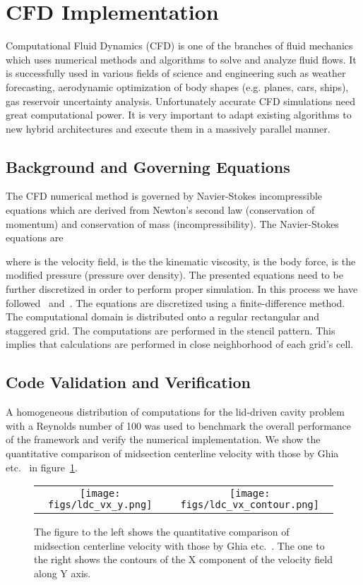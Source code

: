 \documentclass{IOS-Book-Article}
\begin{document}
\section{CFD Implementation}
\label{CFD}
Computational Fluid Dynamics (CFD) is one of the branches of fluid mechanics which 
uses numerical methods and algorithms to solve and analyze fluid flows. It is successfully 
used in various fields of science and engineering such as weather forecasting, 
aerodynamic optimization of body shapes (e.g. planes, cars, ships), gas reservoir uncertainty analysis. 
Unfortunately accurate CFD simulations need great computational power.
It is very important to adapt existing algorithms to new hybrid architectures and execute them
in a massively parallel manner. 

\subsection{Background and Governing Equations}
The CFD numerical method is governed by Navier-Stokes incompressible equations which are 
derived from Newton's second law (conservation of momentum) and conservation of mass 
(incompressibility). The Navier-Stokes equations are


where  is the velocity field,  is the the kinematic viscosity,  is the body force,
 is the modified pressure (pressure over density). 
The presented equations need to be further discretized in order to perform proper simulation.
In this process we have followed~\cite{VOF_Hirt79} and~\cite{NASA_VOF2D_Torrey}.
The equations are discretized using a finite-difference method. The computational 
domain is distributed onto a regular rectangular and staggered grid. 
The computations are performed in the stencil pattern. This implies that calculations 
are performed in close neighborhood of each grid's cell. 




\subsection{Code Validation and Verification}
A homogeneous distribution of computations for the lid-driven cavity problem with a Reynolds 
number of 100 was used to benchmark the 
overall performance of the framework and verify the numerical implementation. We show 
the quantitative comparison of midsection centerline velocity with those by Ghia etc.~\cite{GhiaLDC} in
figure~\ref{fig:comparison}.

\begin{figure}
\begin{tabular}{cc}
\texttt{[image: figs/ldc\_vx\_y.png]}
&\texttt{[image: figs/ldc\_vx\_contour.png]}\\
\end{tabular}
\caption{The figure to the left shows the quantitative comparison of midsection centerline velocity 
with those by Ghia etc.~\cite{GhiaLDC}. The one to the right shows the contours of the X component
of the velocity field along Y axis.}
\label{fig:comparison}
\end{figure}
\end{document}
